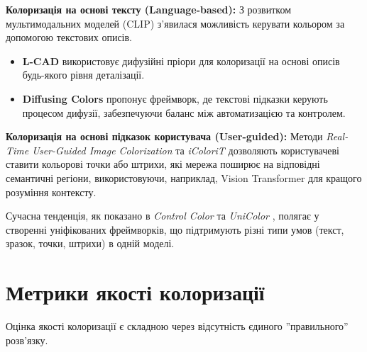     \textbf{Колоризація на основі тексту (Language-based):}
    З розвитком мультимодальних моделей (CLIP) з'явилася можливість керувати кольором за допомогою текстових описів.
    \begin{itemize}[label=$\bullet$]
        \item \textbf{L-CAD} \cite{2023-l-cad} використовує дифузійні пріори для колоризації на основі описів будь-якого рівня деталізації.
        \item \textbf{Diffusing Colors} \cite{2023-diffusing-colors} пропонує фреймворк, де текстові підказки керують процесом дифузії, забезпечуючи баланс між автоматизацією та контролем.
    \end{itemize}

    \textbf{Колоризація на основі підказок користувача (User-guided):}
    Методи \textit{Real-Time User-Guided Image Colorization} \cite{2017-real-time-user-guided-image-colorization} та \textit{iColoriT} \cite{2023-icolorit} дозволяють користувачеві ставити кольорові точки або штрихи, які мережа поширює на відповідні семантичні регіони, використовуючи, наприклад, Vision Transformer для кращого розуміння контексту.

    Сучасна тенденція, як показано в \textit{Control Color} \cite{2025-control-color} та \textit{UniColor} \cite{2022-unicolor}, полягає у створенні уніфікованих фреймворків, що підтримують різні типи умов (текст, зразок, точки, штрихи) в одній моделі.

\section{Метрики якості колоризації}

    Оцінка якості колоризації є складною через відсутність єдиного ''правильного'' розв'язку.

